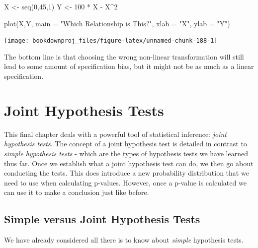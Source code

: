 \documentclass[
]{book}
\newenvironment{Shaded}{\begin{snugshade}}{\end{snugshade}}
\newcommand{\AttributeTok}[1]{\textcolor[rgb]{0.77,0.63,0.00}{#1}}
\newcommand{\DecValTok}[1]{\textcolor[rgb]{0.00,0.00,0.81}{#1}}
\newcommand{\FunctionTok}[1]{\textcolor[rgb]{0.00,0.00,0.00}{#1}}
\newcommand{\NormalTok}[1]{#1}
\newcommand{\OtherTok}[1]{\textcolor[rgb]{0.56,0.35,0.01}{#1}}
\newcommand{\SpecialCharTok}[1]{\textcolor[rgb]{0.00,0.00,0.00}{#1}}
\newcommand{\StringTok}[1]{\textcolor[rgb]{0.31,0.60,0.02}{#1}}
\begin{document}
\begin{Shaded}
\begin{Highlighting}[]
\NormalTok{X }\OtherTok{\textless{}{-}} \FunctionTok{seq}\NormalTok{(}\DecValTok{0}\NormalTok{,}\DecValTok{45}\NormalTok{,}\DecValTok{1}\NormalTok{)}
\NormalTok{Y }\OtherTok{\textless{}{-}} \DecValTok{100} \SpecialCharTok{*}\NormalTok{ X }\SpecialCharTok{{-}}\NormalTok{ X}\SpecialCharTok{\^{}}\DecValTok{2}

\FunctionTok{plot}\NormalTok{(X,Y,}
     \AttributeTok{main =} \StringTok{"Which Relationship is This?"}\NormalTok{,}
     \AttributeTok{xlab =} \StringTok{"X"}\NormalTok{,}
     \AttributeTok{ylab =} \StringTok{"Y"}\NormalTok{)}
\end{Highlighting}
\end{Shaded}

\begin{center}\texttt{[image: bookdownproj\_files/figure-latex/unnamed-chunk-188-1]} \end{center}

The bottom line is that choosing the wrong non-linear transformation will still lead to some amount of specification bias, but it might not be as much as a linear specification.

\hypertarget{JHT}{%
\chapter{Joint Hypothesis Tests}\label{JHT}}

This final chapter deals with a powerful tool of statistical inference: \emph{joint hypothesis tests}. The concept of a joint hypothesis test is detailed in contrast to \emph{simple hypothesis tests} - which are the types of hypothesis tests we have learned thus far. Once we establish what a joint hypothesis test can do, we then go about conducting the tests. This does introduce a new probability distribution that we need to use when calculating p-values. However, once a p-value is calculated we can use it to make a conclusion just like before.

\hypertarget{simple-versus-joint-hypothesis-tests}{%
\section{Simple versus Joint Hypothesis Tests}\label{simple-versus-joint-hypothesis-tests}}

We have already considered all there is to know about \emph{simple} hypothesis tests.
\end{document}
